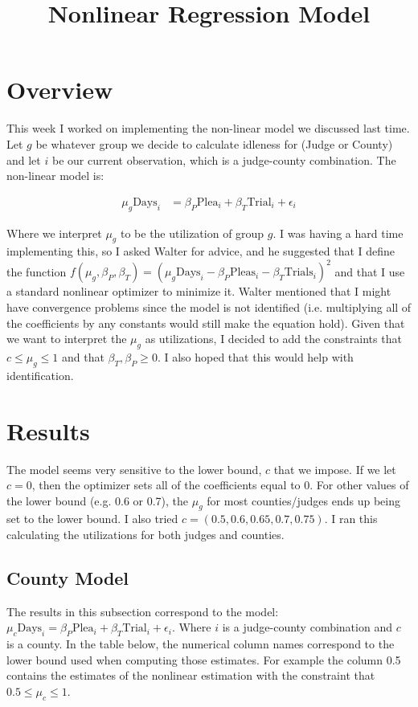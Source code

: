 \documentclass[11pt]{article}
\title{Nonlinear Regression Model}
\begin{document}
\maketitle

\section{Overview}
  This week I worked on implementing the non-linear model we discussed last time. Let $g$ be whatever group we decide to calculate idleness for (Judge or County) and let $i$ be our current observation, which is a judge-county combination. The non-linear model is:

  \begin{align*}
    \mu_g \text{Days}_i &= \beta_P \text{Plea}_i + \beta_T \text{Trial}_i + \epsilon_i
  \end{align*}

  Where we interpret $\mu_g$ to be the utilization of group $g$. I was having a hard time implementing this, so I asked Walter for advice, and he suggested that I define the function $f(\mu_g,\beta_P,\beta_T) = (\mu_g \text{Days}_i - \beta_P \text{Pleas}_i - \beta_T \text{Trials}_i)^2$ and that I use a standard nonlinear optimizer to minimize it. Walter mentioned that I might have convergence problems since the model is not identified (i.e. multiplying all of the coefficients by any constants would still make the equation hold). Given that we want to interpret the $\mu_g$ as utilizations, I decided to add the constraints that $c \leq \mu_g \leq 1$ and that $\beta_T, \beta_P \geq 0$. I also hoped that this would help with identification.

\section{Results}
  The model seems very sensitive to the lower bound, $c$ that we impose. If we let $c=0$, then the optimizer sets all of the coefficients equal to 0. For other values of the lower bound (e.g. 0.6 or 0.7), the $\mu_g$ for most counties/judges ends up being set to the lower bound. I also tried $c=(0.5,0.6,0.65,0.7,0.75)$. I ran this calculating the utilizations for both judges and counties.

  \subsection{County Model}
    The results in this subsection correspond to the model: $\mu_c \text{Days}_i = \beta_P \text{Plea}_i + \beta_T \text{Trial}_i + \epsilon_i$. Where $i$ is a judge-county combination and $c$ is a county. In the table below, the numerical column names correspond to the lower bound used when computing those estimates. For example the column 0.5 contains the estimates of the nonlinear estimation with the constraint that $0.5 \leq \mu_c \leq 1$.
\end{document}
